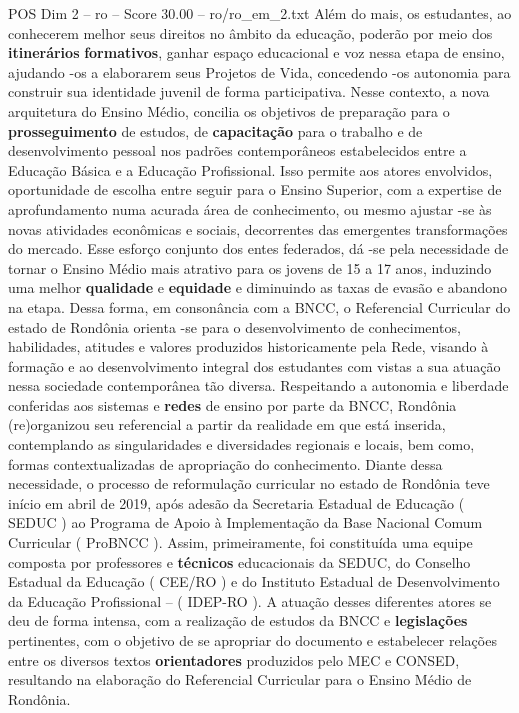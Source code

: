 \begin{textsample}{POS Dim 2 – ro – Score 30.00 – ro/ro\_em\_2.txt}
Além do mais, os estudantes, ao conhecerem melhor seus direitos no âmbito da educação, poderão por meio dos \textbf{itinerários} \textbf{formativos}, ganhar espaço educacional e voz nessa etapa de ensino, ajudando -os a elaborarem seus Projetos de Vida, concedendo -os autonomia para construir sua identidade juvenil de forma participativa.
Nesse contexto, a nova arquitetura do Ensino Médio, concilia os objetivos de preparação para o \textbf{prosseguimento} de estudos, de \textbf{capacitação} para o trabalho e de desenvolvimento pessoal nos padrões contemporâneos estabelecidos entre a Educação Básica e a Educação Profissional.
Isso permite aos atores envolvidos, oportunidade de escolha entre seguir para o Ensino Superior, com a expertise de aprofundamento numa acurada área de conhecimento, ou mesmo ajustar -se às novas atividades econômicas e sociais, decorrentes das emergentes transformações do mercado.
Esse esforço conjunto dos entes federados, dá -se pela necessidade de tornar o Ensino Médio mais atrativo para os jovens de 15 a 17 anos, induzindo uma melhor \textbf{qualidade} e \textbf{equidade} e diminuindo as taxas de evasão e abandono na etapa.
Dessa forma, em consonância com a BNCC, o Referencial Curricular do estado de Rondônia orienta -se para o desenvolvimento de conhecimentos, habilidades, atitudes e valores produzidos historicamente pela Rede, visando à formação e ao desenvolvimento integral dos estudantes com vistas a sua atuação nessa sociedade contemporânea tão diversa.
Respeitando a autonomia e liberdade conferidas aos sistemas e \textbf{redes} de ensino por parte da BNCC, Rondônia (re)organizou seu referencial a partir da realidade em que está inserida, contemplando as singularidades e diversidades regionais e locais, bem como, formas contextualizadas de apropriação do conhecimento.
Diante dessa necessidade, o processo de reformulação curricular no estado de Rondônia teve início em abril de 2019, após adesão da Secretaria Estadual de Educação ( SEDUC ) ao Programa de Apoio à Implementação da Base Nacional Comum Curricular ( ProBNCC ).
Assim, primeiramente, foi constituída uma equipe composta por professores e \textbf{técnicos} educacionais da SEDUC, do Conselho Estadual da Educação ( CEE/RO ) e do Instituto Estadual de Desenvolvimento da Educação Profissional – ( IDEP-RO ).
A atuação desses diferentes atores se deu de forma intensa, com a realização de estudos da BNCC e \textbf{legislações} pertinentes, com o objetivo de se apropriar do documento e estabelecer relações entre os diversos textos \textbf{orientadores} produzidos pelo MEC e CONSED, resultando na elaboração do Referencial Curricular para o Ensino Médio de Rondônia.

\end{textsample}
